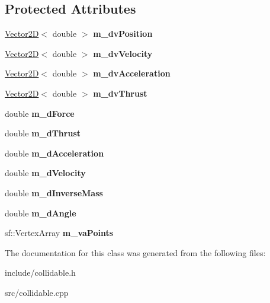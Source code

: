 \subsection*{Protected Attributes}
\begin{DoxyCompactItemize}
\item 
\hypertarget{class_collidable_aa9b3dd6f54428c0e538eb75a5166dd93}{}\hyperlink{class_vector2_d}{Vector2\+D}$<$ double $>$ {\bfseries m\+\_\+dv\+Position}\label{class_collidable_aa9b3dd6f54428c0e538eb75a5166dd93}

\item 
\hypertarget{class_collidable_ab7f405cb0f44372741baff129eabb8a8}{}\hyperlink{class_vector2_d}{Vector2\+D}$<$ double $>$ {\bfseries m\+\_\+dv\+Velocity}\label{class_collidable_ab7f405cb0f44372741baff129eabb8a8}

\item 
\hypertarget{class_collidable_abda695eecdb275f43bdb9fce1f58ef09}{}\hyperlink{class_vector2_d}{Vector2\+D}$<$ double $>$ {\bfseries m\+\_\+dv\+Acceleration}\label{class_collidable_abda695eecdb275f43bdb9fce1f58ef09}

\item 
\hypertarget{class_collidable_aa8bc9d03ab2be264b819053f347c432a}{}\hyperlink{class_vector2_d}{Vector2\+D}$<$ double $>$ {\bfseries m\+\_\+dv\+Thrust}\label{class_collidable_aa8bc9d03ab2be264b819053f347c432a}

\item 
\hypertarget{class_collidable_a69d06f98760bca141c613a4f4f256a5d}{}double {\bfseries m\+\_\+d\+Force}\label{class_collidable_a69d06f98760bca141c613a4f4f256a5d}

\item 
\hypertarget{class_collidable_acf991846cbb2b81c4cee2900c92c9260}{}double {\bfseries m\+\_\+d\+Thrust}\label{class_collidable_acf991846cbb2b81c4cee2900c92c9260}

\item 
\hypertarget{class_collidable_a1e3f4151e4cd0771b24ed0029ff796cb}{}double {\bfseries m\+\_\+d\+Acceleration}\label{class_collidable_a1e3f4151e4cd0771b24ed0029ff796cb}

\item 
\hypertarget{class_collidable_a9253389e228d50dec0a4c0c12bf6e604}{}double {\bfseries m\+\_\+d\+Velocity}\label{class_collidable_a9253389e228d50dec0a4c0c12bf6e604}

\item 
\hypertarget{class_collidable_aa6b2bd9cb61b6f410e94c43e1ae25abc}{}double {\bfseries m\+\_\+d\+Inverse\+Mass}\label{class_collidable_aa6b2bd9cb61b6f410e94c43e1ae25abc}

\item 
\hypertarget{class_collidable_ad3a6769c49a8d2ee0b0434849952dcb2}{}double {\bfseries m\+\_\+d\+Angle}\label{class_collidable_ad3a6769c49a8d2ee0b0434849952dcb2}

\item 
\hypertarget{class_collidable_a13a62d6d9fb69397c5ad03e6ec1c3b2d}{}sf\+::\+Vertex\+Array {\bfseries m\+\_\+va\+Points}\label{class_collidable_a13a62d6d9fb69397c5ad03e6ec1c3b2d}

\end{DoxyCompactItemize}


The documentation for this class was generated from the following files\+:\begin{DoxyCompactItemize}
\item 
include/collidable.\+h\item 
src/collidable.\+cpp\end{DoxyCompactItemize}
